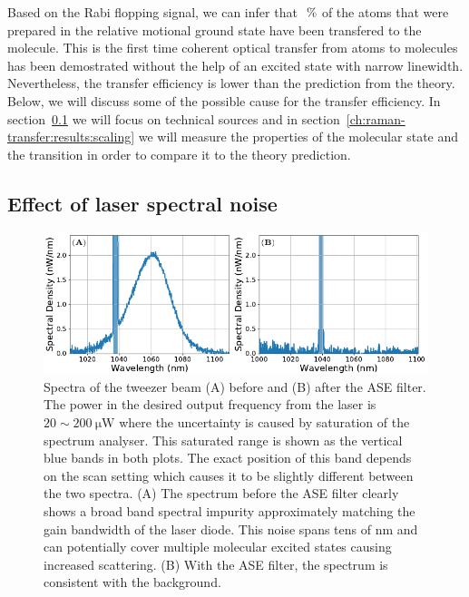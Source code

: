 Based on the Rabi flopping signal, we can infer that $\todo{number}~\mathrm{\%}$ of the atoms
that were prepared in the relative motional ground state have been transfered to the molecule.
This is the first time coherent optical transfer from atoms to molecules has been demostrated
without the help of an excited state with narrow linewidth.
Nevertheless, the transfer efficiency is lower than the prediction from the theory. Below, we will discuss some of the possible cause for the transfer efficiency.
In section~\ref{ch:raman-transfer:results:ase} we will focus on technical sources
and in section~\ref{ch:raman-transfer:results:scaling}
we will measure the properties of the molecular state and the transition
in order to compare it to the theory prediction.

\subsection{Effect of laser spectral noise}
\label{ch:raman-transfer:results:ase}

\begin{figure}
  \centering
  \includegraphics[width=\textwidth]{figures/raman_transfer_spectra.pdf}
  \caption[Tweezer spectra before and after ASE filter]{
    Spectra of the tweezer beam (A) before and (B) after the ASE filter.
    The power in the desired output frequency from the laser is $20\sim200~\mathrm{\mu W}$
    where the uncertainty is caused by saturation of the spectrum analyser.
    This saturated range is shown as the vertical blue bands in both plots.
    The exact position of this band depends on the scan setting
    which causes it to be slightly different between the two spectra.
    (A) The spectrum before the ASE filter clearly shows a broad band spectral impurity
    approximately matching the gain bandwidth of the laser diode.
    This noise spans tens of nm and can potentially cover multiple molecular excited states
    causing increased scattering.
    (B) With the ASE filter, the spectrum is consistent with the background.
    \label{fig:raman-transfer:results:ase:spectra}}
\end{figure}

